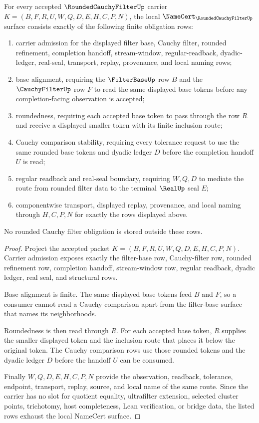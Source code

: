 \begin{theorem}\label{thm:rounded-cauchy-filter-namecert-obligations}
For every accepted $\RoundedCauchyFilterUp$ carrier $K=(B,F,R,U,W,Q,D,E,H,C,P,N)$, the local $\NameCert_{\RoundedCauchyFilterUp}$ surface consists exactly of the following finite obligation rows:
\begin{enumerate}
\item carrier admission for the displayed filter base, Cauchy filter, rounded refinement, completion handoff, stream-window, regular-readback, dyadic-ledger, real-seal, transport, replay, provenance, and local naming rows;
\item base alignment, requiring the $\FilterBaseUp$ row $B$ and the $\CauchyFilterUp$ row $F$ to read the same displayed base tokens before any completion-facing observation is accepted;
\item roundedness, requiring each accepted base token to pass through the row $R$ and receive a displayed smaller token with its finite inclusion route;
\item Cauchy comparison stability, requiring every tolerance request to use the same rounded base tokens and dyadic ledger $D$ before the completion handoff $U$ is read;
\item regular readback and real-seal boundary, requiring $W,Q,D$ to mediate the route from rounded filter data to the terminal $\RealUp$ seal $E$;
\item componentwise transport, displayed replay, provenance, and local naming through $H,C,P,N$ for exactly the rows displayed above.
\end{enumerate}
No rounded Cauchy filter obligation is stored outside these rows.
\end{theorem}
\begin{proof}
Project the accepted packet $K=(B,F,R,U,W,Q,D,E,H,C,P,N)$. Carrier admission exposes exactly the filter-base row, Cauchy-filter row, rounded refinement row, completion handoff, stream-window row, regular readback, dyadic ledger, real seal, and structural rows.

Base alignment is finite. The same displayed base tokens feed $B$ and $F$, so a consumer cannot read a Cauchy comparison apart from the filter-base surface that names its neighborhoods.

Roundedness is then read through $R$. For each accepted base token, $R$ supplies the smaller displayed token and the inclusion route that places it below the original token. The Cauchy comparison rows use those rounded tokens and the dyadic ledger $D$ before the handoff $U$ can be consumed.

Finally $W,Q,D,E,H,C,P,N$ provide the observation, readback, tolerance, endpoint, transport, replay, source, and local name of the same route. Since the carrier has no slot for quotient equality, ultrafilter extension, selected cluster points, trichotomy, host completeness, Lean verification, or bridge data, the listed rows exhaust the local NameCert surface.
\end{proof}

